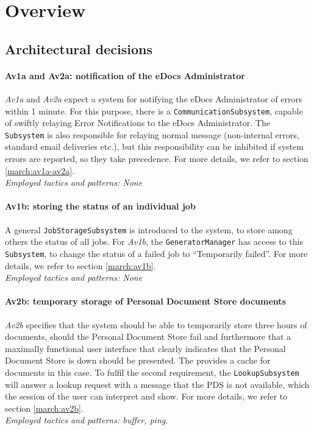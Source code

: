 \section{Overview}\label{sec:overview}
\subsection{Architectural decisions}

\paragraph{Av1a and Av2a: notification of the eDocs Administrator}
\emph{Av1a} and \emph{Av2a} expect a system for notifying the eDocs Administrator of errors within 1 minute. For this purpose, there is a \texttt{CommunicationSubsystem}, capable of swiftly relaying Error Notifications to the eDocs Administrator. The \texttt{Subsystem} is also responsible for relaying normal message (non-internal errors, standard email deliveries etc.), but this responsibility can be inhibited if system errors are reported, so they take precedence. For more details, we refer to section \ref{march:av1a-av2a}.\\
\emph{Employed tactics and patterns: None}
    
\paragraph{Av1b: storing the status of an individual job}
A general \texttt{JobStorageSubsystem} is introduced to the system, to store among others the status of all jobs. For \emph{Av1b}, the \texttt{GeneratorManager} has access to this \texttt{Subsystem}, to change the status of a failed job to ``Temporarily failed''. For more details, we refer to section \ref{march:av1b}.\\
\emph{Employed tactics and patterns: None}
    
\paragraph{Av2b: temporary storage of Personal Document Store documents} \emph{Av2b} specifies that the system should be able to temporarily store three hours of documents, should the Personal Document Store fail and furthermore that a maximally functional user interface that clearly indicates that the Personal Document Store is down should be presented. The  provides a cache for documents in this case. To fulfil the second requirement, the \texttt{LookupSubsystem} will answer a lookup request with a message that the PDS is not available, which the session of the user can interpret and show. For more details, we refer to section \ref{march:av2b}.\\
\emph{Employed tactics and patterns: buffer, ping.}
    
